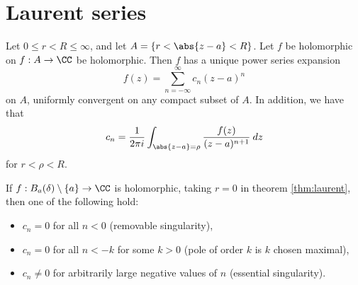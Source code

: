 \section{Laurent series}

\begin{theorem}[name=Laurent's theorem,label=thm:laurent]
  Let $0 \leq r < R \leq \infty$, and let $A = \{ r < \abs{z - a} < R \}$. Let $f$ be holomorphic on $f : A \rightarrow \CC$ be holomorphic. Then $f$ has a unique power series expansion
\[
f(z) = \sum_{n = -\infty}^{\infty} c_n(z - a)^n
\]
on $A$, uniformly convergent on any compact subset of $A$.
In addition, we have that
\[
c_n = \frac{1}{2 \pi i} \int_{\abs{z - a} = \rho} \frac{f(z)}{(z-a)^{n+1}} \: dz
\]
for $r < \rho < R$.
\end{theorem}

\begin{remark}
  If $f : B_a(\delta) \setminus \{ a \} \rightarrow \CC$ is holomorphic, taking $r = 0$ in theorem \ref{thm:laurent}, then one of the following hold:
  \begin{itemize}
    \item $c_n = 0$ for all $n < 0$ (removable singularity),
    \item $c_n = 0$ for all $n < -k$ for some $k > 0$ (pole of order $k$ is $k$ chosen maximal),
    \item $c_n \neq 0$ for arbitrarily large negative values of $n$ (essential singularity).
  \end{itemize}
\end{remark}

